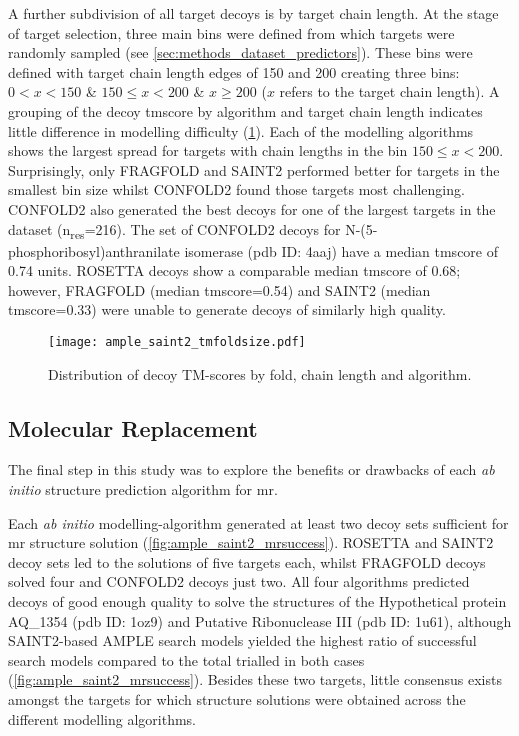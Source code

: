 A further subdivision of all target decoys is by target chain length. At the stage of target selection, three main bins were defined from which targets were randomly sampled (see \cref{sec:methods_dataset_predictors}). These bins were defined with target chain length edges of 150 and 200 creating three bins: $0 < x < 150$ \& $150 \leq x < 200$ \& $x \geq 200$ ($x$ refers to the target chain length). A grouping of the decoy \gls{tmscore} by algorithm and target chain length indicates little difference in modelling difficulty (\cref{fig:ample_saint2_tmfoldsize}). Each of the modelling algorithms shows the largest spread for targets with chain lengths in the bin $150 \leq x < 200$. Surprisingly, only FRAGFOLD and SAINT2 performed better for targets in the smallest bin size whilst CONFOLD2 found those targets most challenging. CONFOLD2 also generated the best decoys for one of the largest targets in the dataset (n\textsubscript{res}=216). The set of CONFOLD2 decoys for N-(5-phosphoribosyl)anthranilate isomerase (\gls{pdb} ID: 4aaj) have a median \gls{tmscore} of 0.74 units. ROSETTA decoys show a comparable median \gls{tmscore} of 0.68; however, FRAGFOLD (median \gls{tmscore}=0.54) and SAINT2 (median \gls{tmscore}=0.33) were unable to generate decoys of similarly high quality.

\begin{figure}[H]
    \centering
    \texttt{[image: ample\_saint2\_tmfoldsize.pdf]}
    \caption{Distribution of decoy TM-scores by fold, chain length and algorithm.}
    \label{fig:ample_saint2_tmfoldsize}
\end{figure}

\subsection{Molecular Replacement}
The final step in this study was to explore the benefits or drawbacks of each \textit{ab initio} structure prediction algorithm for \gls{mr}.

Each \textit{ab initio} modelling-algorithm generated at least two decoy sets sufficient for \gls{mr} structure solution (\cref{fig:ample_saint2_mrsuccess}). ROSETTA and SAINT2 decoy sets led to the solutions of five targets each, whilst FRAGFOLD decoys solved four and CONFOLD2 decoys just two. All four algorithms predicted decoys of good enough quality to solve the structures of the Hypothetical protein AQ\_1354 (\gls{pdb} ID: 1oz9) and Putative Ribonuclease III (\gls{pdb} ID: 1u61), although SAINT2-based AMPLE search models yielded the highest ratio of successful search models compared to the total trialled in both cases (\cref{fig:ample_saint2_mrsuccess}). Besides these two targets, little consensus exists amongst the targets for which structure solutions were obtained across the different modelling algorithms.

